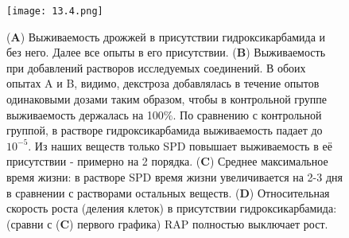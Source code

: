 \begin{figure}[H]
	\centering
		\texttt{[image: 13.4.png]}
		\caption{(\textbf{A}) Выживаемость дрожжей в присутствии гидроксикарбамида и без него. Далее все опыты в его присутствии. (\textbf{B}) Выживаемость при добавлений растворов исследуемых соединений. В обоих опытах A и B, видимо, декстроза добавлялась в течение опытов одинаковыми дозами таким образом, чтобы в контрольной группе выживаемость держалась на 100$\%$. По сравнению с контрольной группой, в растворе гидроксикарбамида выживаемость падает до $10^{-5}$. Из наших веществ только SPD повышает выживаемость в её присутствии - примерно на 2 порядка. (\textbf{C}) Среднее максимальное время жизни: в растворе SPD время жизни увеличивается на 2-3 дня в сравнении с растворами остальных веществ. (\textbf{D}) Относительная скорость роста (деления клеток) в присутствии гидроксикарбамида: (сравни с (\textbf{C})  первого графика) RAP полностью выключает рост.}
\end{figure}